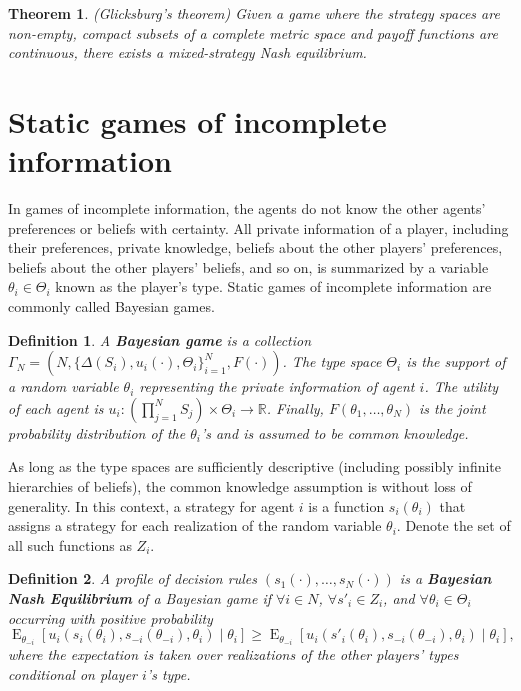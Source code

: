 \documentclass[letter, 10pt]{article}
\newtheorem{definition}{Definition}[section]
\newtheorem{theorem}{Theorem}[section]
\newcommand{\R}{\mathbb{R}}
\newcommand{\E}{\operatorname{E}}
\begin{document}
\begin{spacing}{1.1}
\begin{theorem}
  (Glicksburg's theorem) Given a game where the strategy spaces are
  non-empty, compact subsets of a complete metric space and payoff
  functions are continuous, there exists a mixed-strategy Nash equilibrium.
\end{theorem}

\section{Static games of incomplete information}

In games of incomplete information, the agents do not know the other
agents' preferences or beliefs with certainty. All private information of a
player, including their preferences, private knowledge, beliefs about the
other players' preferences, beliefs about the other players' beliefs, and
so on, is summarized by a variable $\theta_i \in \Theta_i$ known as the
player's type. Static games of incomplete information are commonly called
Bayesian games.

\begin{definition}
  A \textbf{Bayesian game} is a collection $\Gamma_N = \left(N, \{\Delta(S_i),
    u_i(\cdot), \Theta_i\}_{i=1}^N, F(\cdot)\right)$. The type space $\Theta_i$
  is the support of a random variable $\theta_i$ representing the private
  information of agent $i$.  The utility of each agent is $u_i: \left(
    \prod_{j=1}^N S_j\right) \times \Theta_i  \to \R$. Finally, $F(\theta_1, \ldots, \theta_N)$ is the
  joint probability distribution of the $\theta_i$'s and is assumed to be
  common knowledge.
\end{definition}

As long as the type spaces are sufficiently descriptive (including possibly
infinite hierarchies of beliefs), the common knowledge assumption is
without loss of generality. In this context, a strategy for agent $i$ is a
function $s_i(\theta_i)$ that assigns a strategy for each realization of
the random variable $\theta_i$. Denote the set of all such functions as
$Z_i$.

\begin{definition}
  A profile of decision rules $(s_1(\cdot), \ldots, s_N(\cdot))$ is a
  \textbf{Bayesian Nash Equilibrium} of a Bayesian game if $\forall i \in N$, $\forall s'_i \in Z_i$, and $\forall \theta_i
  \in \Theta_i$ occurring with positive
  probability \[\E_{\theta_{-i}}\left[u_i(s_i(\theta_i), s_{-i}(\theta_{-i}),
    \theta_i) \;|\; \theta_i \right] \geq \E_{\theta_{-i}}\left[u_i(s'_i(\theta_i), s_{-i}(\theta_{-i}),
    \theta_i) \;|\; \theta_i \right], \] where the expectation is taken over
  realizations of the other players' types conditional on player $i$'s type.
\end{definition}


\end{spacing}
\end{document}
